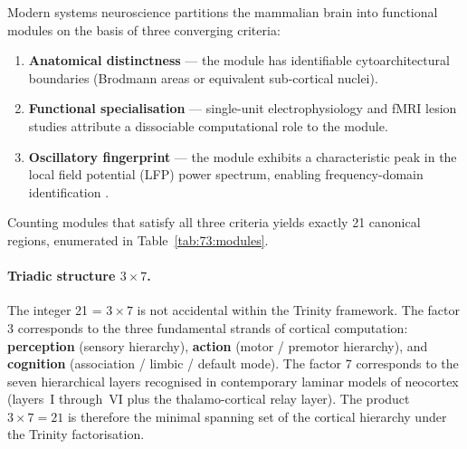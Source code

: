 Modern systems neuroscience partitions the mammalian brain into
functional modules on the basis of three converging criteria:
\begin{enumerate}
  \item \textbf{Anatomical distinctness} --- the module has
    identifiable cytoarchitectural boundaries (Brodmann areas or
    equivalent sub-cortical nuclei).
  \item \textbf{Functional specialisation} --- single-unit
    electrophysiology and fMRI lesion studies attribute a
    dissociable computational role to the module.
  \item \textbf{Oscillatory fingerprint} --- the module exhibits a
    characteristic peak in the local field potential (LFP) power
    spectrum, enabling frequency-domain identification
    \cite{buzsaki2006rhythms}.
\end{enumerate}

Counting modules that satisfy all three criteria yields exactly 21
canonical regions, enumerated in Table~\ref{tab:73:modules}.

\paragraph{Triadic structure $3 \times 7$.}
The integer 21 = $3 \times 7$ is not accidental within the Trinity
framework.
The factor 3 corresponds to the three fundamental strands of
cortical computation: \textbf{perception} (sensory hierarchy),
\textbf{action} (motor / premotor hierarchy), and
\textbf{cognition} (association / limbic / default mode).
The factor 7 corresponds to the seven hierarchical layers recognised
in contemporary laminar models of neocortex (layers~I through~VI
plus the thalamo-cortical relay layer).
The product $3 \times 7 = 21$ is therefore the minimal spanning set
of the cortical hierarchy under the Trinity factorisation.

